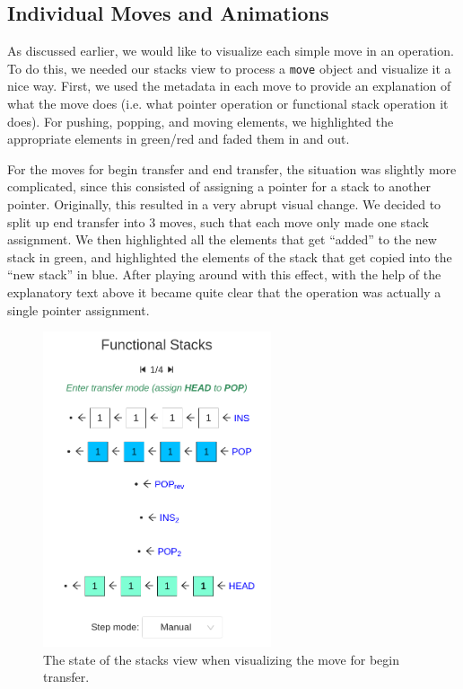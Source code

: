 \documentclass[runningheads]{llncs}
\begin{document}
\subsection{Individual Moves and Animations}

As discussed earlier, we would like to visualize each simple move in an operation. To do this, we needed our stacks view to process a \texttt{move} object and visualize it a nice way. First, we used the metadata in each move to provide an explanation of what the move does (i.e. what pointer operation or functional stack operation it does). For pushing, popping, and moving elements, we highlighted the appropriate elements in green/red and faded them in and out. 

For the moves for begin transfer and end transfer, the situation was slightly more complicated, since this consisted of assigning a pointer for a stack to another pointer. Originally, this resulted in a very abrupt visual change. We decided to split up end transfer into 3 moves, such that each move only made one stack assignment. We then highlighted all the elements that get ``added'' to the new stack in green, and highlighted the elements of the stack that get copied into the ``new stack'' in blue. After playing around with this effect, with the help of the explanatory text above it became quite clear that the operation was actually a single pointer assignment.

\begin{figure}[H]
    \centering
    \includegraphics[width=0.6\textwidth]{highlight.png}
    \caption{The state of the stacks view when visualizing the move for begin transfer.}
\end{figure}
\end{document}
